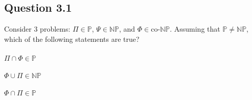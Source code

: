 \documentclass{article}
\begin{document}
\subsection*{Question 3.1}Consider 3 problems: $\Pi \in \mathbb{P}$, $\Psi \in \mathbb{NP}$, and $\Phi \in \text{co-}\mathbb{NP}$. Assuming that $\mathbb P \ne \mathbb{NP}$, which of the following statements are true?
\subsubsection{}
$\Pi\cap\Phi\in\mathbb{P}$
\subsubsection{}
$\Phi\cup\Pi\in\mathbb{NP}$
\subsubsection{}
$\Phi\cap\Pi\in\mathbb{P}$
\end{document}
